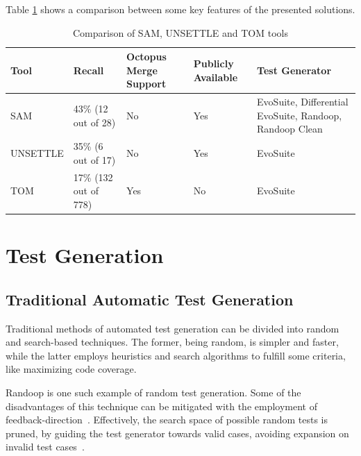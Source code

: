 Table \ref{table:tool-comparison} shows a comparison between some key features of the presented solutions.


\begin{table}[!h]
\setlength\extrarowheight{2pt}
\begin{tabularx}{\textwidth}{|p{} | 
p{} | p{} | p{}  | p{}|}
 \hline
 Tool & Recall & Octopus Merge Support & Publicly Available & Test Generator \\ [0.5ex] 
 \hline\hline
  SAM & 43\% \newline (12 out of 28) & No & Yes & EvoSuite, Differential EvoSuite, Randoop, Randoop Clean \\ 
 \hline
  UNSETTLE & 35\% \newline (6 out of 17) & No & Yes & EvoSuite \\
 \hline
   TOM & 17\% \newline (132 out of 778) & Yes & No & EvoSuite \\ [1ex] 
 \hline
\end{tabularx}
\caption{\label{table:tool-comparison}Comparison of SAM, UNSETTLE and TOM tools \citep{kn:leuson2}\citep{kn:nuno}\citep{kn:ji2022}}
\end{table}



\section{Test Generation}

\subsection{Traditional Automatic Test Generation}

Traditional methods of automated test generation can be divided into random and search-based techniques. The former, being random, is simpler and faster, while the latter employs heuristics and search algorithms to fulfill some criteria, like maximizing code coverage.

Randoop is one such example of random test generation. Some of the disadvantages of this technique can be mitigated with the employment of feedback-direction~\citep{kn:randoop}. Effectively, the search space of possible random tests is pruned, by guiding the test generator towards valid cases, avoiding expansion on invalid test cases~\citep{kn:randoop}.

